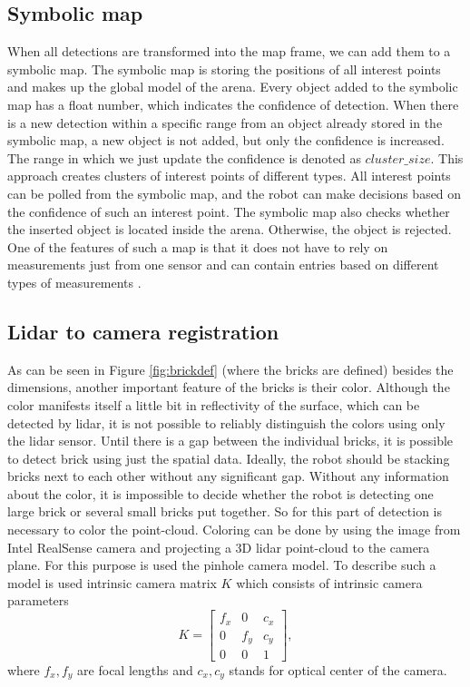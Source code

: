 \subsection{Symbolic map}
When all detections are transformed into the map frame, we can add them to a symbolic map. The symbolic map is storing the positions of all interest points and makes up the global model of the arena. Every object added to the symbolic map has a float number, which indicates the confidence of detection. When there is a new detection within a specific range from an object already stored in the symbolic map, a new object is not added, but only the confidence is increased. The range in which we just update the confidence is denoted as $cluster\_size$. This approach creates clusters of interest points of different types. All interest points can be polled from the symbolic map, and the robot can make decisions based on the confidence of such an interest point. The symbolic map also checks whether the inserted object is located inside the arena. Otherwise, the object is rejected. One of the features of such a map is that it does not have to rely on measurements just from one sensor and can contain entries based on different types of measurements \cite{majer2019}.

\subsection{Lidar to camera registration}
As can be seen in Figure \ref{fig:brickdef} (where the bricks are defined) besides the dimensions, another important feature of the bricks is their color. Although the color manifests itself a little bit in reflectivity of the surface, which can be detected by lidar, it is not possible to reliably distinguish the colors using only the lidar sensor. Until there is a gap between the individual bricks, it is possible to detect brick using just the spatial data. Ideally, the robot should be stacking bricks next to each other without any significant gap. Without any information about the color, it is impossible to decide whether the robot is detecting one large brick or several small bricks put together. So for this part of detection is necessary to color the point-cloud. Coloring can be done by using the image from Intel RealSense camera and projecting a 3D lidar point-cloud to the camera plane. For this purpose is used the pinhole camera model. To describe such a model is used intrinsic camera matrix $K$ which consists of intrinsic camera parameters \cite{hartley2017}
\begin{equation}
K = \begin{bmatrix}
f_x & 0 & c_x \\
0 & f_y & c_y \\
0 & 0 & 1
\end{bmatrix},
\end{equation}
where $f_x, f_y$ are focal lengths and $c_x, c_y$ stands for optical center of the camera.

